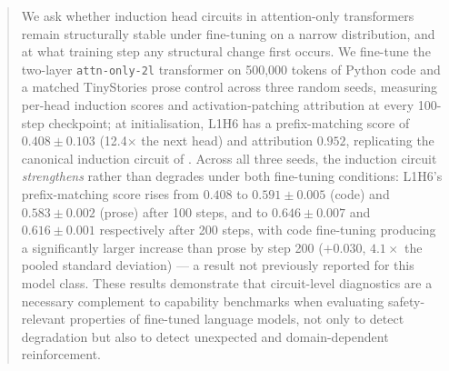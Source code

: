 \begin{abstract}
We ask whether induction head circuits in attention-only transformers remain
structurally stable under fine-tuning on a narrow distribution, and at what
training step any structural change first occurs.
%
We fine-tune the two-layer \texttt{attn-only-2l} transformer on 500{,}000
tokens of Python code and a matched TinyStories prose control across three
random seeds, measuring per-head induction scores and activation-patching
attribution at every 100-step checkpoint; at initialisation, L1H6 has a
prefix-matching score of $0.408 \pm 0.103$ (12.4$\times$ the next head) and
attribution $0.952$, replicating the canonical induction circuit of
\citet{olsson2022context}.
%
Across all three seeds, the induction circuit \emph{strengthens} rather than
degrades under both fine-tuning conditions: L1H6's prefix-matching score
rises from $0.408$ to $0.591 \pm 0.005$ (code) and $0.583 \pm 0.002$ (prose)
after 100 steps, and to $0.646 \pm 0.007$ and $0.616 \pm 0.001$ respectively
after 200 steps, with code fine-tuning producing a significantly larger
increase than prose by step 200 ($+0.030$, $4.1\times$ the pooled
standard deviation) --- a result not previously reported for this model class.
%
These results demonstrate that circuit-level diagnostics are a necessary
complement to capability benchmarks when evaluating safety-relevant
properties of fine-tuned language models, not only to detect degradation
but also to detect unexpected and domain-dependent reinforcement.
\end{abstract}
